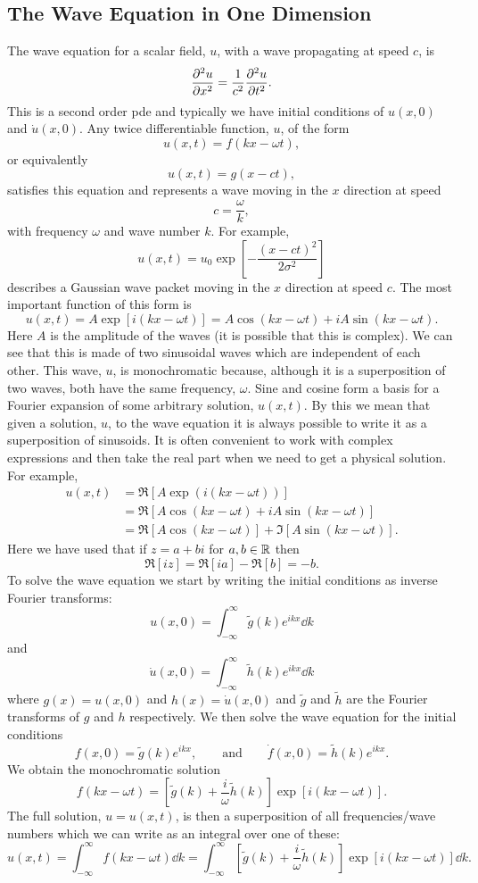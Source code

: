    \subsection{The Wave Equation in One Dimension}
    The wave equation for a scalar field, \(u\), with a wave propagating at speed \(c\), is
    \[\pdv[2]{u}{x} = \frac{1}{c^2}\pdv[2]{u}{t}.\]
    This is a second order \gls{pde} and typically we have initial conditions of \(u(x, 0)\) and \(\dot{u}(x, 0)\).
    Any twice differentiable function, \(u\), of the form
    \[u(x, t) = f(kx - \omega t),\]
    or equivalently
    \[u(x, t) = g(x - ct),\]
    satisfies this equation and represents a wave moving in the \(x\) direction at speed
    \[c = \frac{\omega}{k},\]
    with frequency \(\omega\) and wave number \(k\).
    For example,
    \[u(x, t) = u_0\exp\left[-\frac{(x - ct)^2}{2\sigma^2}\right]\]
    describes a Gaussian wave packet moving in the \(x\) direction at speed \(c\).
    The most important function of this form is
    \[u(x, t) = A\exp[i(kx - \omega t)] = A\cos(kx - \omega t) + iA\sin(kx - \omega t).\]
    Here \(A\) is the amplitude of the waves (it is possible that this is complex).
    We can see that this is made of two sinusoidal waves which are independent of each other.
    This wave, \(u\), is monochromatic because, although it is a superposition of two waves, both have the same frequency, \(\omega\).
    Sine and cosine form a basis for a Fourier expansion of some arbitrary solution, \(u(x, t)\).
    By this we mean that given a solution, \(u\), to the wave equation it is always possible to write it as a superposition of sinusoids.
    It is often convenient to work with complex expressions and then take the real part when we need to get a physical solution.
    For example,
    \begin{align*}
        u(x, t) &= \Re[A\exp(i(kx - \omega t))]\\
        &= \Re[A\cos(kx - \omega t) + iA\sin(kx - \omega t)]\\
        &= \Re[A\cos(kx - \omega t)] + \Im[A\sin(kx - \omega t)].
    \end{align*}
    Here we have used that if \(z = a + bi\) for \(a, b\in\mathbb{R}\) then 
    \[\Re[iz] = \Re[ia] - \Re[b] = -b.\]
    To solve the wave equation we start by writing the initial conditions as inverse Fourier transforms:
    \[u(x, 0) = \int_{-\infty}^{\infty} \tilde{g}(k)e^{ikx}\dd{k}\]
    and
    \[\dot{u}(x, 0) = \int_{-\infty}^{\infty} \tilde{h}(k)e^{ikx}\dd{k}\]
    where \(g(x) = u(x, 0)\) and \(h(x) = \dot{u}(x, 0)\) and \(\tilde{g}\) and \(\tilde{h}\) are the Fourier transforms of \(g\) and \(h\) respectively.
    We then solve the wave equation for the initial conditions
    \[f(x, 0) = \tilde{g}(k)e^{ikx},\qquad\text{and}\qquad \dot{f}(x, 0) = \tilde{h}(k)e^{ikx}.\]
    We obtain the monochromatic solution
    \[f(kx - \omega t) = \left[\tilde{g}(k) + \frac{i}{\omega}\tilde{h}(k)\right]\exp[i(kx - \omega t)].\]
    The full solution, \(u = u(x, t)\), is then a superposition of all frequencies/wave numbers which we can write as an integral over one of these:
    \[u(x, t) = \int_{-\infty}^{\infty} f(kx - \omega t)\dd{k} = \int_{-\infty}^{\infty} \left[\tilde{g}(k) + \frac{i}{\omega}\tilde{h}(k)\right]\exp[i(kx - \omega t)]\dd{k}.\]
    

